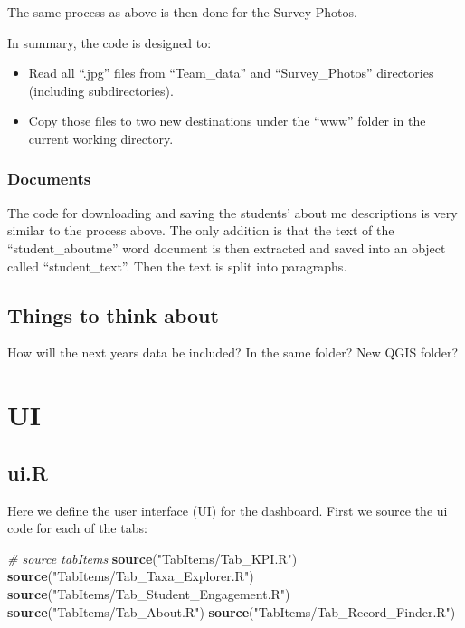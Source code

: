 \documentclass[
]{book}
\newenvironment{Shaded}{\begin{snugshade}}{\end{snugshade}}
\newcommand{\CommentTok}[1]{\textcolor[rgb]{0.56,0.35,0.01}{\textit{#1}}}
\newcommand{\FunctionTok}[1]{\textcolor[rgb]{0.13,0.29,0.53}{\textbf{#1}}}
\newcommand{\NormalTok}[1]{#1}
\newcommand{\StringTok}[1]{\textcolor[rgb]{0.31,0.60,0.02}{#1}}
\providecommand{\tightlist}{%
  \setlength{\itemsep}{0pt}\setlength{\parskip}{0pt}}
\begin{document}
The same process as above is then done for the Survey Photos.

In summary, the code is designed to:

\begin{itemize}
\tightlist
\item
  Read all ``.jpg'' files from ``Team\_data'' and ``Survey\_Photos'' directories (including subdirectories).
\item
  Copy those files to two new destinations under the ``www'' folder in the current working directory.
\end{itemize}

\hypertarget{documents}{%
\subsection{Documents}\label{documents}}

The code for downloading and saving the students' about me descriptions is very similar to the process above. The only addition is that the text of the ``student\_aboutme'' word document is then extracted and saved into an object called ``student\_text''. Then the text is split into paragraphs.

\hypertarget{things-to-think-about}{%
\section{Things to think about}\label{things-to-think-about}}

How will the next years data be included? In the same folder? New QGIS folder?

\hypertarget{ui}{%
\chapter{UI}\label{ui}}

\hypertarget{ui.r}{%
\section{ui.R}\label{ui.r}}

Here we define the user interface (UI) for the dashboard. First we source the ui code for each of the tabs:

\begin{Shaded}
\begin{Highlighting}[]
\CommentTok{\# source tabItems}
\FunctionTok{source}\NormalTok{(}\StringTok{"TabItems/Tab\_KPI.R"}\NormalTok{)}
\FunctionTok{source}\NormalTok{(}\StringTok{"TabItems/Tab\_Taxa\_Explorer.R"}\NormalTok{)}
\FunctionTok{source}\NormalTok{(}\StringTok{"TabItems/Tab\_Student\_Engagement.R"}\NormalTok{)}
\FunctionTok{source}\NormalTok{(}\StringTok{"TabItems/Tab\_About.R"}\NormalTok{)}
\FunctionTok{source}\NormalTok{(}\StringTok{"TabItems/Tab\_Record\_Finder.R"}\NormalTok{)}
\end{Highlighting}
\end{Shaded}
\end{document}
